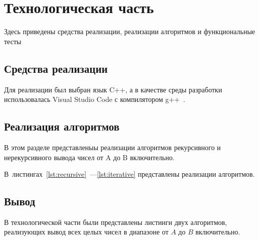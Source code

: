 \chapter{Технологическая часть}

Здесь приведены средства реализации, реализации алгоритмов и функциональные тесты

\section{Средства реализации}

Для реализации был выбран язык C++, а в качестве среды разработки использовалась 
Visual Studio Code с компилятором g++~\cite{mscpp}.



\section{Реализация алгоритмов}
В этом разделе представленыы реализации алгоритмов рекурсивного и нерекурсивного вывода чисел от A до B включительно.

В~листингах~\ref{lst:recursive}~---\ref{lst:iterative} представлены реализации алгоритмов.


\section*{Вывод}

В технологической части были представлены листинги двух алгоритмов, реализующих вывод всех целых чисел в диапазоне от $A$ до $B$ включительно.

\clearpage
